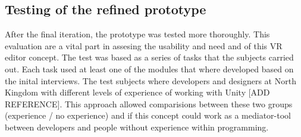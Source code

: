 \subsection{Testing of the refined prototype}
After the final iteration, the prototype was tested more thoroughly. This evaluation are a vital part in assesing the usability and need and of this VR editor concept. The test was based as a series of tasks that the subjects carried out. Each task used at least one of the modules that where developed based on the inital interviews. The test subjects where developers and designers at North Kingdom with different levels of experience of working with Unity [ADD REFERENCE]. This approach allowed comparisions between these two groups (experience / no experience) and if this concept could work as a mediator-tool between developers and people without experience within programming. 
